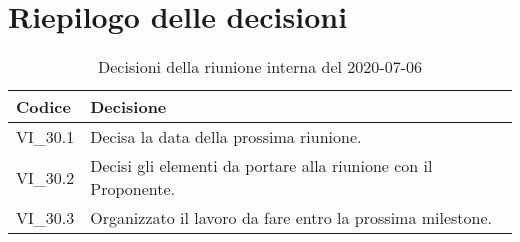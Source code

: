 \section{Riepilogo delle decisioni}
\begin{longtable}{ 
	 >{\centering}p{} >{}p{} }
	
	\caption{Decisioni della riunione interna del 2020-07-06}\\	
	
	\textbf{\color{white}Codice} & 
	\textbf{\color{white}Decisione} 
	\tabularnewline  
	\endhead
	
	VI\_30.1 & Decisa la data della prossima riunione. \\
	VI\_30.2 & Decisi gli elementi da portare alla riunione con il Proponente\ped{\textit{G}}. \\
	VI\_30.3 & Organizzato il lavoro da fare entro la prossima milestone. \\
\end{longtable}
